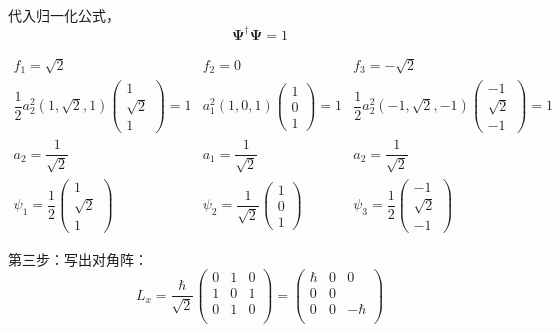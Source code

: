 \begin{frame} 
    代入归一化公式， $$ \pmb {\Psi} ^{\dagger } \pmb {\Psi} =1 $$

    $$\begin{matrix}
    f_1=\sqrt{2} & f_2=0  &  f_3=-\sqrt{2}\\
    \dfrac{1}{2} a_2 ^2 (1, \sqrt{2}, 1)
    \begin{pmatrix}
    1\\
    {\sqrt{2}}\\
    1
    \end{pmatrix} 
    =1 
    & 
    a_1 ^2 (1, 0, 1)
    \begin{pmatrix}
     1\\
     0\\
     1
    \end{pmatrix} 
    =1 
     &
     \dfrac{1}{2} a_2 ^2 (-1, \sqrt{2}, -1)
    \begin{pmatrix}
     -1\\
     {\sqrt{2}}\\
     -1
    \end{pmatrix} 
    =1 \\
    a_2= \dfrac{1}{\sqrt{2}} &  a_1= \dfrac{1}{\sqrt{2}} &   a_2=\dfrac{1}{\sqrt{2}} 
    \\
    \psi_1=\dfrac{1}{2}
    \begin{pmatrix}
    1\\
    \sqrt{2}\\
    1
    \end{pmatrix}  
    & 
    \psi_2=\dfrac{1}{\sqrt{2}}
    \begin{pmatrix}
    1\\
    0\\
    1
    \end{pmatrix}  
    &
    \psi_3=\dfrac{1}{2}
    \begin{pmatrix}
    -1\\
    \sqrt{2}\\
    -1
    \end{pmatrix}  
    \end{matrix}$$   
\end{frame}

\begin{frame} 
    第三步：写出对角阵：
    $$ L_x= \frac{\hbar}{\sqrt{2}}
        \begin{pmatrix}
            0 & 1 & 0  \\
            1 & 0 & 1  \\
            0 & 1 & 0 \\
         \end{pmatrix} 
    = 
    \begin{pmatrix}
        \hbar & 0 & 0  \\
        0 & 0 &   \\
        0 & 0 & -\hbar \\
     \end{pmatrix} 
    $$
\end{frame}

